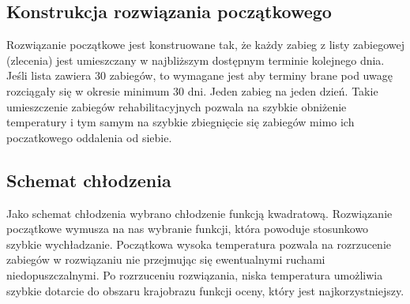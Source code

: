 \subsection{Konstrukcja rozwiązania początkowego}
Rozwiązanie początkowe jest konstruowane tak, że każdy zabieg z listy zabiegowej
(zlecenia) jest
umieszczany w najbliższym dostępnym terminie kolejnego dnia. Jeśli lista zawiera
30 zabiegów, to wymagane jest aby terminy brane pod uwagę rozciągały się w
okresie minimum 30 dni. Jeden zabieg na jeden dzień. Takie umieszczenie zabiegów
rehabilitacyjnych pozwala na szybkie obniżenie temperatury i tym samym na
szybkie zbiegnięcie się zabiegów mimo ich poczatkowego oddalenia od siebie.

\subsection{Schemat chłodzenia}
Jako schemat chłodzenia wybrano chłodzenie funkcją kwadratową. Rozwiązanie początkowe
wymusza na nas wybranie funkcji, która powoduje stosunkowo szybkie wychładzanie.
Początkowa wysoka temperatura pozwala na rozrzucenie zabiegów w rozwiązaniu nie
przejmując się ewentualnymi ruchami niedopuszczalnymi. Po rozrzuceniu
rozwiązania, niska temperatura umożliwia szybkie dotarcie do obszaru krajobrazu
funkcji oceny, który jest najkorzystniejszy.

